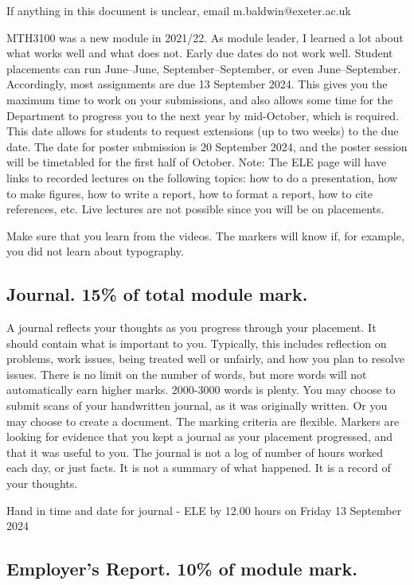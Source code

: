 \documentclass[11pt]{article}
\begin{document}
If anything in this document is unclear, email m.baldwin@exeter.ac.uk



MTH3100 was a new module in 2021/22. As module leader, I learned a lot about what works well and what does not. Early due dates do not work well. Student placements can run June–June, September–September, or even June–September. Accordingly, most assignments are due 13 September 2024. This gives you the maximum time to work on your submissions, and also allows some time for the Department to progress you to the next year by mid-October, which is required. This date allows for students to request extensions (up to two weeks) to the due date. The date for poster submission is 20 September 2024, and the poster session will be timetabled for the first half of October. Note: The ELE page will have links to recorded lectures on the following topics: how to do a presentation, how to make figures, how to write a report, how to format a report, how to cite references, etc. Live lectures are not possible since you will be on placements.

Make sure that you learn from the videos. The markers will know if, for example, you did not learn about typography.

\subsection{Journal. 15\% of total module mark.}
\label{sec:org1795d7e}

A journal reflects your thoughts as you progress through your placement. It should contain what is important to you. Typically, this includes reflection on problems, work issues, being treated well or unfairly, and how you plan to resolve issues. There is no limit on the number of words, but more words will not automatically earn higher marks. 2000-3000 words is
plenty. You may choose to submit scans of your handwritten journal, as it was originally written. Or you may choose to create a document. The marking criteria are flexible. Markers are looking for evidence that you kept a journal as your placement progressed, and that it was useful to you. The journal is not a log of number of hours worked each day, or just facts. It is not a summary of what happened. It is a record of your thoughts.

Hand in time and date for journal - ELE by 12.00 hours on Friday 13 September 2024

\subsection{Employer’s Report. 10\% of module mark.}
\label{sec:orgf74b6c7}
\end{document}
